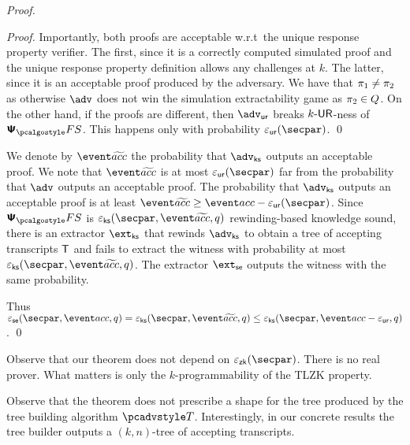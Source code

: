 \begin{proof}
\begin{proof}
	Importantly, both proofs are acceptable w.r.t~the unique response property verifier. The first, since it is a correctly computed simulated proof and the unique response property definition allows any challenges at $k$. The latter, since it is an acceptable proof produced by the adversary.
	We have that $\pi_1 \neq \pi_2$ as otherwise $\advse$ does not win the simulation extractability game as $\pi_2 \in Q$. On the other hand, if the proofs are different, then $\advur$ breaks ${k\text{-}\mathsf{UR}}$-ness of $\psfs$. This happens only with  probability $\epsur(\secpar)$. 
	\qed
	\end{proof}

	We denote by $\waccProb$ the probability that $\advcss$ outputs an acceptable proof. We note that $\waccProb$ is at most $\epsur (\secpar)$ far from the probability that $\advse$ outputs an acceptable proof. The probability that $\advcss$ outputs an acceptable proof is at least $\waccProb \geq \accProb - \epsur (\secpar)$. %
%
	Since $\psfs$ is $\epscss (\secpar, \waccProb,q)$ rewinding-based knowledge sound, there is an extractor $\extcss$ that rewinds $\advcss$ to obtain a tree of accepting transcripts $\mathsf{T}$ and fails to extract the witness with probability at most $\epscss (\secpar, \waccProb, q)$. The extractor $\extse$ outputs the witness with the same probability.

%
	Thus $\epsse(\secpar,\accProb,q) = \epscss (\secpar, \waccProb,q) \leq \epscss(\secpar,\accProb - \epsur,q)$.
	\qed
	\end{proof}

\begin{remark}
Observe that our theorem does not depend on $\epszk(\secpar)$. There is no real prover. What matters is only the $k$-programmability of the TLZK property. 
\end{remark}

\begin{remark}
Observe that the theorem does not prescribe a shape for the tree produced by the tree building algorithm $\tdv$. Interestingly, in our concrete results the tree builder outputs a $(k, n)$-tree of accepting transcripts.
\end{remark}


